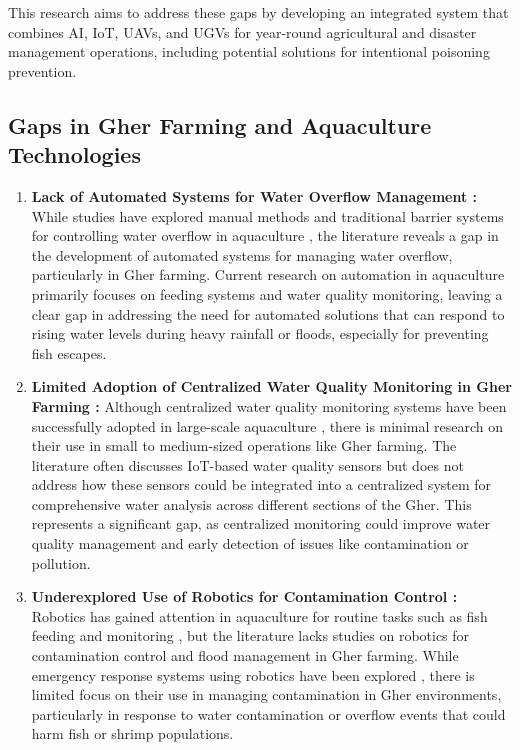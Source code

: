 \documentclass[conference]{IEEEtran}
\begin{document}
This research aims to address these gaps by developing an integrated system that combines AI, IoT, UAVs, and UGVs for year-round agricultural and disaster management operations, including potential solutions for intentional poisoning prevention.

\subsection{ \textbf{Gaps in Gher Farming and Aquaculture Technologies}}
\begin{enumerate}
	\item \textbf{ Lack of Automated Systems for Water Overflow Management : }
	While studies have explored manual methods and traditional barrier systems for controlling water overflow in aquaculture \cite{ref23}, the literature reveals a gap in the development of automated systems for managing water overflow, particularly in Gher farming. Current research on automation in aquaculture \cite{ref24} primarily focuses on feeding systems and water quality monitoring, leaving a clear gap in addressing the need for automated solutions that can respond to rising water levels during heavy rainfall or floods, especially for preventing fish escapes.
	
	\item \textbf{ Limited Adoption of Centralized Water Quality Monitoring in Gher Farming : }
	Although centralized water quality monitoring systems have been successfully adopted in large-scale aquaculture \cite{ref17}, there is minimal research on their use in small to medium-sized operations like Gher farming. The literature often discusses IoT-based water quality sensors \cite{ref18} but does not address how these sensors could be integrated into a centralized system for comprehensive water analysis across different sections of the  Gher. This represents a significant gap, as centralized monitoring could improve water quality management and early detection of issues like contamination or pollution.
	
	\item \textbf{Underexplored Use of Robotics for Contamination Control : }
	Robotics has gained attention in aquaculture for routine tasks such as fish feeding and monitoring \cite{ref19}, but the literature lacks studies on robotics for contamination control and flood management in Gher farming. While emergency response systems using robotics have been explored \cite{ref21}, there is limited focus on their use in managing contamination in Gher environments, particularly in response to water contamination or overflow events that could harm fish or shrimp populations.
	

\end{enumerate}
\end{document}
